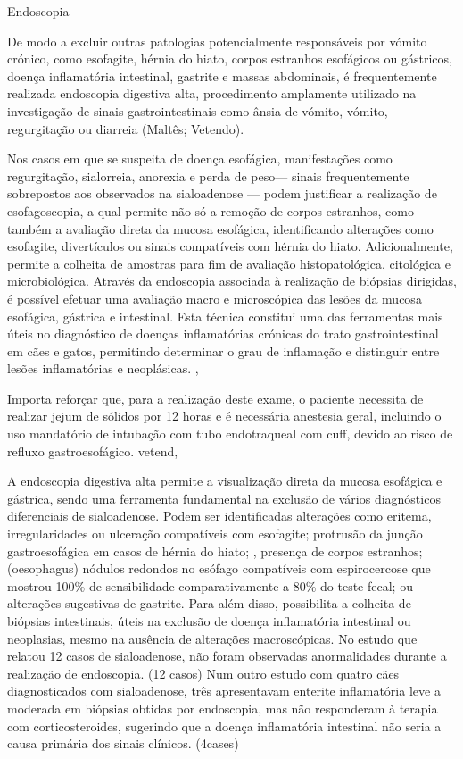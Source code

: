 Endoscopia 


De modo a excluir outras patologias potencialmente responsáveis por vómito crónico, como esofagite, hérnia do hiato, corpos estranhos esofágicos ou gástricos, doença inflamatória intestinal, gastrite e massas abdominais, é frequentemente realizada endoscopia digestiva alta, procedimento amplamente utilizado na investigação de sinais gastrointestinais como ânsia de vómito, vómito, regurgitação ou diarreia (Maltês; Vetendo).


Nos casos em que se suspeita de doença esofágica, manifestações como regurgitação, sialorreia, anorexia e perda de peso— sinais frequentemente sobrepostos aos observados na sialoadenose — podem justificar a realização de esofagoscopia, a qual permite não só a remoção de corpos estranhos, como também a avaliação direta da mucosa esofágica, identificando alterações como esofagite, divertículos ou sinais compatíveis com hérnia do hiato. \cite{Sum2009} Adicionalmente, permite a colheita de amostras para fim de avaliação histopatológica, citológica e microbiológica. \cite{Prasanna2019} Através da endoscopia associada à realização de biópsias dirigidas, é possível efetuar uma avaliação macro e microscópica das lesões da mucosa esofágica, gástrica e intestinal. \cite{Rychlik2020} Esta técnica constitui uma das ferramentas mais úteis no diagnóstico de doenças inflamatórias crónicas do trato gastrointestinal em cães e gatos, permitindo determinar o grau de inflamação e distinguir entre lesões inflamatórias e neoplásicas. \cite{Rychlik2020},\cite{Jergens2016}


Importa reforçar que, para a realização deste exame, o paciente necessita de realizar jejum de sólidos por 12 horas e é necessária anestesia geral, incluindo o uso mandatório de intubação com tubo endotraqueal com cuff, devido ao risco de refluxo gastroesofágico. vetend,\cite{Bsavaendo}


A endoscopia digestiva alta permite a visualização direta da mucosa esofágica e gástrica, sendo uma ferramenta fundamental na exclusão de vários diagnósticos diferenciais de sialoadenose. \cite{Bsavaendo} Podem ser identificadas alterações como eritema, irregularidades ou ulceração compatíveis com esofagite;\cite{Bsavaendo} protrusão da junção gastroesofágica em casos de hérnia do hiato; \cite{Kim2021},\cite{Broux2018} presença de corpos estranhos;(oesophagus) nódulos redondos no esófago compatíveis com espirocercose que mostrou 100\% de sensibilidade comparativamente a 80\% do teste fecal;\cite{vanderMerwe2008}\cite{file23333} ou alterações sugestivas de gastrite. Para além disso, possibilita a colheita de biópsias intestinais, úteis na exclusão de doença inflamatória intestinal ou neoplasias, mesmo na ausência de alterações macroscópicas. \cite{Cerquetella2010} No estudo que relatou 12 casos de sialoadenose, não foram observadas anormalidades durante a realização de endoscopia. (12 casos) Num outro estudo com quatro cães diagnosticados com sialoadenose, três apresentavam enterite inflamatória leve a moderada em biópsias obtidas por endoscopia, mas não responderam à terapia com corticosteroides, sugerindo que a doença inflamatória intestinal não seria a causa primária dos sinais clínicos. (4cases)


